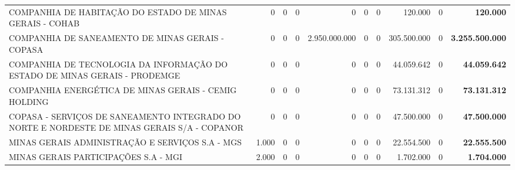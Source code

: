 \documentclass{article}
\begin{document}
\begin{longtable}[c]{m{2.0cm}|m{1.35cm}|m{1.35cm}|m{1.35cm}|m{1.35cm}|m{1.35cm}|m{1.35cm}|m{1.35cm}|m{1.35cm}|m{1.0cm}}
\multicolumn{1}{L{4cm}|}{COMPANHIA DE HABITAÇÃO DO ESTADO DE MINAS GERAIS - COHAB} & \multicolumn{1}{r|}{    0} & \multicolumn{1}{r|}{0} & \multicolumn{1}{r|}{            0} & \multicolumn{1}{r|}{            0} & \multicolumn{1}{r|}{0} & \multicolumn{1}{r|}{0} & \multicolumn{1}{r|}{120.000} & \multicolumn{1}{r|}{0} & \multicolumn{1}{r}{ \textbf{120.000}} \\
\multicolumn{1}{L{4cm}|}{COMPANHIA DE SANEAMENTO DE MINAS GERAIS - COPASA} & \multicolumn{1}{r|}{    0} & \multicolumn{1}{r|}{0} & \multicolumn{1}{r|}{            0} & \multicolumn{1}{r|}{2.950.000.000} & \multicolumn{1}{r|}{0} & \multicolumn{1}{r|}{0} & \multicolumn{1}{r|}{305.500.000} & \multicolumn{1}{r|}{0} & \multicolumn{1}{r}{ \textbf{3.255.500.000}} \\
\multicolumn{1}{L{4cm}|}{COMPANHIA DE TECNOLOGIA DA INFORMAÇÃO DO ESTADO DE MINAS GERAIS - PRODEMGE} & \multicolumn{1}{r|}{    0} & \multicolumn{1}{r|}{0} & \multicolumn{1}{r|}{            0} & \multicolumn{1}{r|}{            0} & \multicolumn{1}{r|}{0} & \multicolumn{1}{r|}{0} & \multicolumn{1}{r|}{44.059.642} & \multicolumn{1}{r|}{0} & \multicolumn{1}{r}{ \textbf{44.059.642}} \\
\multicolumn{1}{L{4cm}|}{COMPANHIA ENERGÉTICA DE MINAS GERAIS - CEMIG HOLDING} & \multicolumn{1}{r|}{    0} & \multicolumn{1}{r|}{0} & \multicolumn{1}{r|}{            0} & \multicolumn{1}{r|}{            0} & \multicolumn{1}{r|}{0} & \multicolumn{1}{r|}{0} & \multicolumn{1}{r|}{73.131.312} & \multicolumn{1}{r|}{0} & \multicolumn{1}{r}{ \textbf{73.131.312}} \\
\multicolumn{1}{L{4cm}|}{COPASA - SERVIÇOS DE SANEAMENTO INTEGRADO DO NORTE E NORDESTE DE MINAS GERAIS S/A - COPANOR} & \multicolumn{1}{r|}{    0} & \multicolumn{1}{r|}{0} & \multicolumn{1}{r|}{            0} & \multicolumn{1}{r|}{            0} & \multicolumn{1}{r|}{0} & \multicolumn{1}{r|}{0} & \multicolumn{1}{r|}{47.500.000} & \multicolumn{1}{r|}{0} & \multicolumn{1}{r}{ \textbf{47.500.000}} \\
\multicolumn{1}{L{4cm}|}{MINAS GERAIS ADMINISTRAÇÃO E SERVIÇOS S.A - MGS} & \multicolumn{1}{r|}{1.000} & \multicolumn{1}{r|}{0} & \multicolumn{1}{r|}{            0} & \multicolumn{1}{r|}{            0} & \multicolumn{1}{r|}{0} & \multicolumn{1}{r|}{0} & \multicolumn{1}{r|}{22.554.500} & \multicolumn{1}{r|}{0} & \multicolumn{1}{r}{ \textbf{22.555.500}} \\
\multicolumn{1}{L{4cm}|}{MINAS GERAIS PARTICIPAÇÕES S.A - MGI} & \multicolumn{1}{r|}{2.000} & \multicolumn{1}{r|}{0} & \multicolumn{1}{r|}{            0} & \multicolumn{1}{r|}{            0} & \multicolumn{1}{r|}{0} & \multicolumn{1}{r|}{0} & \multicolumn{1}{r|}{1.702.000} & \multicolumn{1}{r|}{0} & \multicolumn{1}{r}{ \textbf{1.704.000}} \\

\end{longtable}
\end{document}

